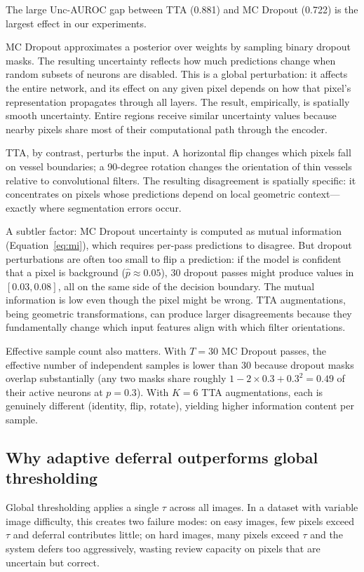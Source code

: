 The large Unc-AUROC gap between TTA (0.881) and MC Dropout (0.722)
is the largest effect in our experiments.

MC Dropout approximates a posterior over weights by sampling binary dropout
masks. The resulting uncertainty reflects how much predictions change when
random subsets of neurons are disabled. This is a global perturbation: it
affects the entire network, and its effect on any given pixel depends on how
that pixel's representation propagates through all layers. The result,
empirically, is spatially smooth uncertainty. Entire regions receive similar
uncertainty values because nearby pixels share most of their computational
path through the encoder.

TTA, by contrast, perturbs the input. A horizontal flip changes which pixels
fall on vessel boundaries; a 90-degree rotation changes the orientation of
thin vessels relative to convolutional filters. The resulting disagreement is
spatially specific: it concentrates on pixels whose predictions depend on
local geometric context---exactly where segmentation errors occur.

A subtler factor: MC Dropout uncertainty is computed as mutual information
(Equation~\ref{eq:mi}), which requires per-pass predictions to disagree.
But dropout perturbations are often too small to flip a prediction: if the
model is confident that a pixel is background ($\hat{p} \approx 0.05$),
30 dropout passes might produce values in $[0.03, 0.08]$, all on the same
side of the decision boundary. The mutual information is low even though the
pixel might be wrong. TTA augmentations, being geometric transformations,
can produce larger disagreements because they fundamentally change which
input features align with which filter orientations.

Effective sample count also matters. With $T = 30$ MC Dropout passes, the
effective number of independent samples is lower than 30 because dropout
masks overlap substantially (any two masks share roughly
$1 - 2 \times 0.3 + 0.3^2 = 0.49$ of their active neurons at $p = 0.3$).
With $K = 6$ TTA augmentations, each is genuinely different (identity, flip,
rotate), yielding higher information content per sample.

\subsection{Why adaptive deferral outperforms global thresholding}

Global thresholding applies a single $\tau$ across all images. In a dataset
with variable image difficulty, this creates two failure modes: on easy images,
few pixels exceed $\tau$ and deferral contributes little; on hard images, many
pixels exceed $\tau$ and the system defers too aggressively, wasting review
capacity on pixels that are uncertain but correct.

